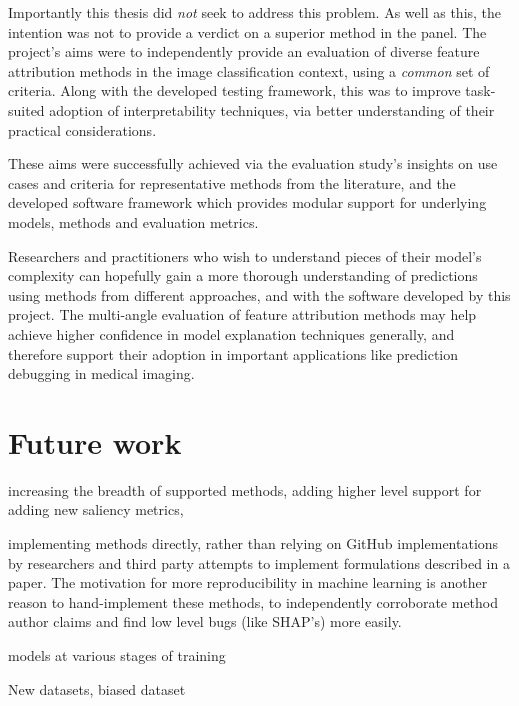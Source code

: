 \documentclass[main]{subfiles}
\begin{document}
Importantly this thesis did \textit{not} seek to address this problem. As well as this, the intention was not to provide a verdict on a superior method in the panel. The project's aims were to independently provide an evaluation of diverse feature attribution methods in the image classification context, using a \textit{common} set of criteria. Along with the developed testing framework, this was to improve task-suited adoption of interpretability techniques, via better understanding of their practical considerations.

These aims were successfully achieved via the evaluation study's insights on use cases and criteria for representative methods from the literature, and the developed software framework which provides modular support for underlying models, methods and evaluation metrics. 

Researchers and practitioners who wish to understand pieces of their model's complexity can hopefully gain a more thorough understanding of predictions using methods from different approaches, and with the software developed by this project. The multi-angle evaluation of feature attribution methods may help achieve higher confidence in model explanation techniques generally, and therefore support their adoption in important applications like prediction debugging in medical imaging.

\section{Future work}


increasing the breadth of supported methods, adding higher level support for adding new saliency metrics, 

implementing methods directly, rather than relying on GitHub implementations by researchers and third party attempts to implement formulations described in a paper. The motivation for more reproducibility in machine learning is another reason to hand-implement these methods, to independently corroborate method author claims and find low level bugs (like SHAP's) more easily.

models at various stages of training

New datasets, biased dataset
\end{document}
